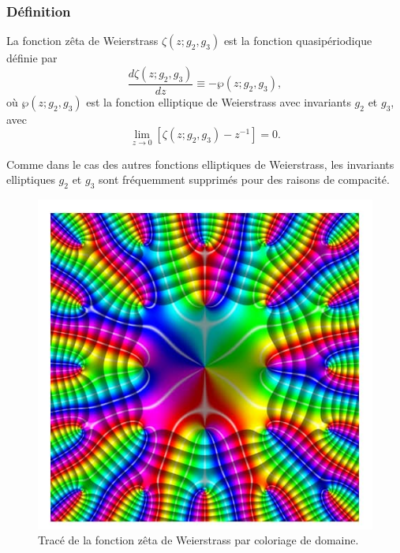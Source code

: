 \documentclass[12pt]{article}
\begin{document}
                        \subsubsection{Définition}
                        La fonction zêta de Weierstrass $\zeta (z; g_2, g_3)$ est la fonction quasipériodique définie par
                        \[
                        \frac{d \zeta (z; g_2, g_3)}{dz} \equiv -\wp (z; g_2, g_3), \tag{1}
                        \]
                        où $\wp (z; g_2, g_3)$ est la fonction elliptique de Weierstrass avec invariants $g_2$ et $g_3$, avec
                        \[
                        \lim_{z \to 0} \left[ \zeta (z; g_2, g_3) - z^{-1} \right] = 0. \tag{2}
                        \]
                        
                        Comme dans le cas des autres fonctions elliptiques de Weierstrass, les invariants elliptiques $g_2$ et $g_3$ sont fréquemment supprimés pour des raisons de compacité.
                        \begin{figure}
                            \centering
                            \includegraphics[width=\linewidth]{fonction_zeta.jpeg}
                            \caption{Tracé de la fonction zêta de Weierstrass par coloriage de domaine.}
                        \end{figure}
\end{document}
